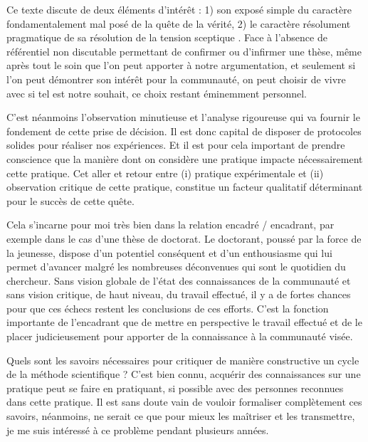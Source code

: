 Ce texte discute de deux éléments d'intérêt : 1) son exposé simple du caractère fondamentalement mal posé de la quête de la vérité, 2) le caractère résolument pragmatique de sa résolution de la \og tension sceptique \fg. Face à l'absence de référentiel non discutable permettant de confirmer ou d'infirmer une thèse, même après tout le soin que l'on peut apporter à notre argumentation, et seulement si l'on peut démontrer son intérêt pour la communauté, on peut choisir de vivre avec si tel est notre souhait, ce choix restant éminemment personnel.

C'est néanmoins l'observation minutieuse et l'analyse rigoureuse qui va fournir le fondement de cette prise de décision. Il est donc capital de disposer de protocoles solides pour réaliser nos expériences. Et il est pour cela important de prendre conscience que la manière dont on considère une pratique impacte nécessairement cette pratique. Cet aller et retour entre (i) pratique expérimentale et (ii) observation critique de cette pratique, constitue un facteur qualitatif déterminant pour le succès de cette quête.

Cela s'incarne pour moi très bien dans la relation encadré / encadrant, par exemple dans le cas d'une thèse de doctorat. Le doctorant, poussé par la force de la jeunesse, dispose d'un potentiel conséquent et d'un enthousiasme qui lui permet d'avancer malgré les nombreuses déconvenues qui sont le quotidien du chercheur. Sans vision globale de l'état des connaissances de la communauté et sans vision critique, de haut niveau, du travail effectué, il y a de fortes chances pour que ces \og échecs \fg restent les conclusions de ces efforts. C'est la fonction importante de l'encadrant que de mettre en perspective le travail effectué et de le placer judicieusement pour apporter de la connaissance à la communauté visée.


Quels sont les savoirs nécessaires pour critiquer de manière constructive un cycle de la méthode scientifique ? C'est bien connu, acquérir des connaissances sur une pratique peut se faire en pratiquant, si possible avec des personnes reconnues dans cette pratique. Il est sans doute vain de vouloir formaliser complètement ces savoirs, néanmoins, ne serait ce que pour mieux les maîtriser et les transmettre, je me suis intéressé à ce problème pendant plusieurs années.


